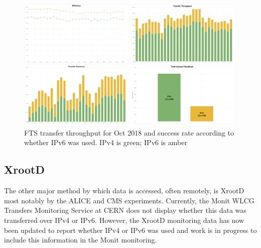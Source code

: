 \begin{figure}[t]
\centering
\includegraphics[width=13cm]{FTS-IPv6-figure}
\caption{FTS transfer throughput for Oct 2018 and success rate according to whether IPv6 was used. IPv4 is green; IPv6 is amber}
\label{fig:fts}
\end{figure}

\subsection{XrootD}
The other major method by which data is accessed, often remotely, is XrootD most notably by the ALICE and CMS experiments. Currently, the Monit WLCG Transfers Monitoring Service at CERN %
does not display whether this data was transferred over IPv4 or IPv6. However, the XrootD monitoring data has now been updated to report whether IPv4 or IPv6 was used %
and work is in progress to include this information in the Monit monitoring.


